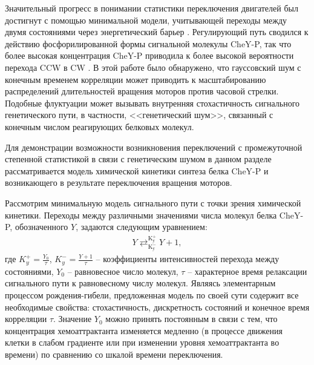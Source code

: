 Значительный прогресс в понимании статистики переключения двигателей был достигнут с помощью минимальной модели, учитывающей переходы между двумя состояниями через энергетический барьер \cite{tu_how_2005}. Регулирующий путь сводился к действию фосфорилированной формы сигнальной молекулы CheY-P, так что более высокая концентрация CheY-P приводила к более высокой вероятности перехода CCW в CW \cite{khan_steady-state_1980}. В этой работе было обнаружено, что гауссовский шум с конечным временем корреляции может приводить к масштабированию распределений длительностей вращения моторов против часовой стрелки. Подобные флуктуации может вызывать внутренняя стохастичность сигнального генетического пути, в частности, <<генетический шум>>, связанный с конечным числом реагирующих белковых молекул.

Для демонстрации возможности возникновения переключений с промежуточной степенной статистикой в связи с генетическим шумом в данном разделе рассматривается модель химической кинетики синтеза белка CheY-P и возникающего в результате переключения вращения моторов. 

Рассмотрим минимальную модель сигнального пути с точки зрения химической кинетики. Переходы между различными значениями числа молекул белка CheY-P, обозначенного $Y$, задаются следующим уравнением:
\begin{equation}
    \begin{aligned}
        Y \mathrel{\mathop{\rightleftarrows}^{\mathrm{K_{y}^{+}}}_{\mathrm{K_{y}^{-}}}} Y + 1,
    \label{eq:chem}
    \end{aligned}
\end{equation}
где $K_{y}^{+}=\frac{Y_0}{\tau}$, $K_{y}^{-}=\frac{Y+1}{\tau}$ -- коэффициенты интенсивностей перехода между состояниями, $Y_0$ -- равновесное число молекул, $\tau$ -- характерное время релаксации сигнального пути к равновесному числу молекул. Являясь элементарным процессом рождения-гибели, предложенная модель по своей сути содержит все необходимые свойства: стохастичность, дискретность состояний и конечное время корреляции $\tau$. Значение $Y_0$ можно принять постоянным в связи с тем, что концентрация хемоаттрактанта изменяется медленно (в процессе движения клетки в слабом градиенте или при изменении уровня хемоаттрактанта во времени) по сравнению со шкалой времени переключения. 

